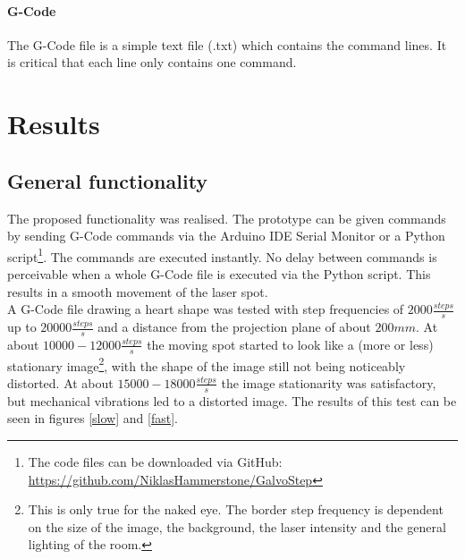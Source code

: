 \documentclass[a4paper, 11pt]{scrartcl}
\begin{document}
\paragraph{G-Code}
The G-Code file is a simple text file (.txt) which contains the command lines. It is critical that each line only contains one command. \\


\section{Results}
\subsection{General functionality}
The proposed functionality was realised. The prototype can be given commands by sending G-Code commands via the Arduino IDE Serial Monitor or a Python script\footnote{The code files can be downloaded via GitHub: \url{https://github.com/NiklasHammerstone/GalvoStep}}. The commands are executed instantly. No delay between commands is perceivable when a whole G-Code file is executed via the Python script. This results in a smooth movement of the laser spot. \\
A G-Code file drawing a heart shape was tested with step frequencies of $2000 \frac{steps}{s}$ up to $20000\frac{steps}{s}$ and a distance from the projection plane of about $200mm$. At about $10000-12000 \frac{steps}{s}$ the moving spot started to look like a (more or less) stationary image\footnote{This is only true for the naked eye. The border step frequency is dependent on the size of the image, the background, the laser intensity and the general lighting of the room.}, with the shape of the image still not being noticeably distorted. At about $15000-18000 \frac{steps}{s}$ the image stationarity was satisfactory, but mechanical vibrations led to a distorted image. The results of this test can be seen in figures \ref{slow} and \ref{fast}. 
\end{document}
